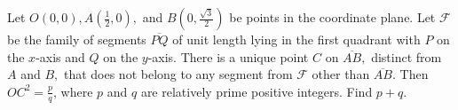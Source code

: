 Let $O(0,0),A(\tfrac{1}{2},0),$ and $B(0,\tfrac{\sqrt{3}}{2})$ be points in the coordinate plane. Let $\mathcal{F}$ be the family of segments $\overline{PQ}$ of unit length lying in the first quadrant with $P$ on the $x$-axis and $Q$ on the $y$-axis. There is a unique point $C$ on $\overline{AB},$ distinct from $A$ and $B,$ that does not belong to any segment from $\mathcal{F}$ other than $\overline{AB}$. Then $OC^2=\tfrac{p}{q}$, where $p$ and $q$ are relatively prime positive integers. Find $p+q$.
